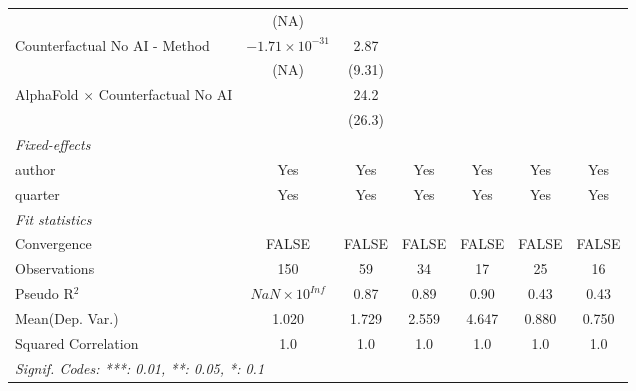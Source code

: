 \begin{tabular}{lcccccc}
                                            & (NA)                    &        &              &             &        &   \\   
   Counterfactual No AI - Method            & $-1.71\times 10^{-31}$  & 2.87   &              &             &        &   \\   
                                            & (NA)                    & (9.31) &              &             &        &   \\   
   AlphaFold $\times$ Counterfactual No AI  &                         & 24.2   &              &             &        &   \\   
                                            &                         & (26.3) &              &             &        &   \\   
   \midrule
   \emph{Fixed-effects}\\
   author                                   & Yes                     & Yes    & Yes          & Yes         & Yes    & Yes\\  
   quarter                                  & Yes                     & Yes    & Yes          & Yes         & Yes    & Yes\\  
   \midrule
   \emph{Fit statistics}\\
   Convergence                              &FALSE                    & FALSE  & FALSE        & FALSE       & FALSE  & FALSE\\  
   Observations                             & 150                     & 59     & 34           & 17          & 25     & 16\\  
   Pseudo R$^2$                             & $NaN\times 10^{Inf}$    & 0.87   & 0.89         & 0.90        & 0.43   & 0.43\\  
Mean(Dep. Var.) & 1.020 & 1.729 & 2.559 & 4.647 & 0.880 & 0.750 \\
   Squared Correlation                      & 1.0                     & 1.0    & 1.0          & 1.0         & 1.0    & 1.0\\  
   \midrule \midrule
   \multicolumn{7}{l}{\emph{Signif. Codes: ***: 0.01, **: 0.05, *: 0.1}}\\
\end{tabular}
\par\endgroup
